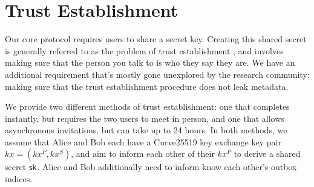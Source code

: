 \section{Trust Establishment}
\label{sec:trustestablishment}

Our core protocol requires users to share a secret key. Creating this shared secret is generally referred to as the problem of trust establishment \cite{unger2015sok}, and involves making sure that the person you talk to is who they say they are. We have an additional requirement that's mostly gone unexplored by the research community: making sure that the trust establishment procedure does not leak metadata.


We provide two different methods of trust establishment: one that completes instantly, but requires the two users to meet in person, and one that allows asynchronous invitations, but can take up to 24 hours. In both methods, we assume that Alice and Bob each have a Curve25519 key exchange key pair $kx = (kx^P, kx^S)$, and aim to inform each other of their $kx^P$ to derive a shared secret ${\mathsf{sk}}$. Alice and Bob additionally need to inform know each other's outbox indices.








